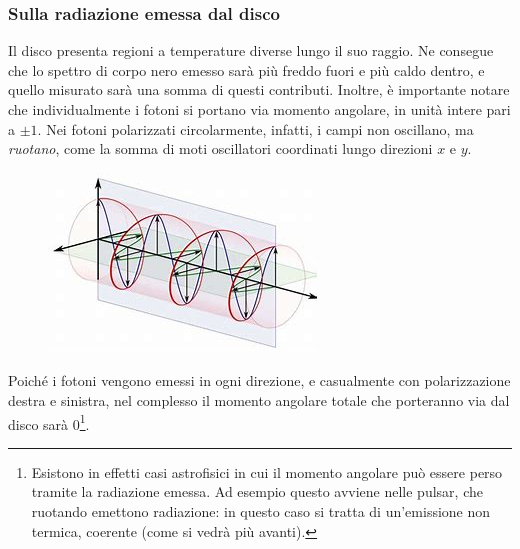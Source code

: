 \subsubsection{Sulla radiazione emessa dal disco}
Il disco presenta regioni a temperature diverse lungo il suo raggio. 
Ne consegue che lo spettro di corpo nero emesso sarà più freddo fuori e più caldo dentro, e quello misurato sarà una somma di questi contributi.
Inoltre, è importante notare che individualmente i fotoni si portano via momento angolare, in unità intere pari a $\pm 1$.
Nei fotoni polarizzati circolarmente, infatti, i campi non oscillano, ma \textit{ruotano}, come la somma di moti oscillatori coordinati lungo direzioni $x$ e $y$.
\begin{figure}[h!]
    \centering
    \includegraphics[width=0.5\linewidth]{Immagini/circular_polarization.jpeg}
    \label{fig:enter-label}
\end{figure}
Poiché i fotoni vengono emessi in ogni direzione, e casualmente con polarizzazione destra e sinistra, nel complesso il momento angolare totale che porteranno via dal disco sarà 0\footnote{Esistono in effetti casi astrofisici in cui il momento angolare può essere perso tramite la radiazione emessa. Ad esempio questo avviene nelle pulsar, che ruotando emettono radiazione: in questo caso si tratta di un'emissione non termica, coerente (come si vedrà più avanti).}.

